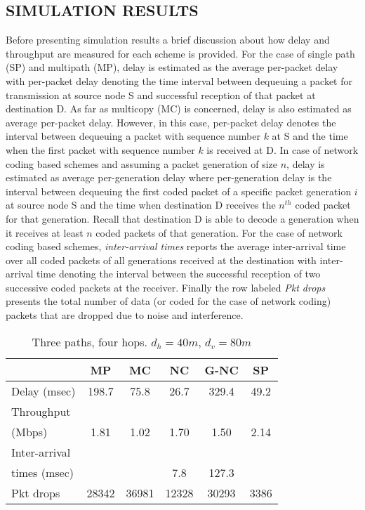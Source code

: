 \documentclass[journal, onecolumn, 12pt]{IEEEtran}
\begin{document}
\subsection{\uppercase{Simulation Results}}
\label{sec:sim_result}

Before presenting simulation results a brief discussion about how delay and throughput are measured for each scheme is provided.
For the case of single path (SP) and multipath (MP), delay is estimated as the average per-packet delay with per-packet delay denoting the time
interval between dequeuing a packet for transmission at source node S and successful reception of that packet at destination D.
As far as multicopy (MC) is concerned, delay is also estimated as average per-packet delay. However, in this case, per-packet delay denotes the interval
between dequeuing a packet with sequence number $k$ at S and the time when the first packet with sequence number $k$ is received at D.
In case of network coding based schemes and assuming a packet generation of size $n$, delay is estimated as average per-generation delay where per-generation delay is the interval between dequeuing
the first coded packet of a specific packet generation $i$ at source node S and the time when destination D receives the $n^{th}$ coded packet for that generation.
Recall that destination D is able to decode a generation when it receives at least $n$ coded packets of that generation.
For the case of network coding based schemes, \textit{inter-arrival times} reports the average inter-arrival time over all coded packets of all generations received at the destination
with inter-arrival time denoting the interval between the successful reception of two successive coded packets at the receiver.
Finally the row labeled \textit{Pkt drops} presents the total number of data (or coded for the case of network coding) packets that are dropped due to noise and interference.

\begin{table}[t]
\begin{center}
\scriptsize
\begin{tabular}{|l|c|c|c|c|c|}
\hline
~                                    & MP & MC & NC & G-NC & SP \\ \hline
Delay (msec)   & 198.7   & 75.8  & 26.7  & 329.4 & 49.2  \\ \hline
Throughput                   & ~  & ~  & ~  & ~         & ~  \\
(Mbps)                   & 1.81  & 1.02  & 1.70 & 1.50 & 2.14 \\ \hline
Inter-arrival              & ~  & ~  & ~  & ~         & ~  \\
times (msec)   &   &   &  7.8 & 127.3 & \\ \hline
Pkt drops  & 28342  & 36981  & 12328  & 30293 & 3386 \\ \hline
\end{tabular}
\end{center}
\caption {Three paths, four hops. $d_{h}=40m$, $d_{v}=80m$}
\label{tab:sim_topol_1}
\end{table}
\end{document}
